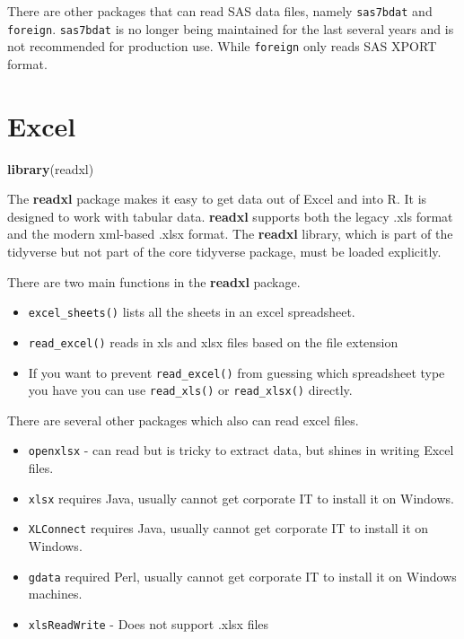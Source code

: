 \documentclass[]{book}
\newenvironment{Shaded}{\begin{snugshade}}{\end{snugshade}}
\newcommand{\KeywordTok}[1]{\textcolor[rgb]{0.13,0.29,0.53}{\textbf{#1}}}
\newcommand{\NormalTok}[1]{#1}
\providecommand{\tightlist}{%
  \setlength{\itemsep}{0pt}\setlength{\parskip}{0pt}}
\newenvironment{rmdblock}[1]
  {\begin{shaded*}
  \begin{itemize}
  \renewcommand{\labelitemi}{
    \raisebox{-.7\height}[0pt][0pt]{
      {\setkeys{Gin}{width=3em,keepaspectratio}\texttt{[image: images/\#1]}}
    }
  }
  \item
  }
  {
  \end{itemize}
  \end{shaded*}
  }
\newenvironment{rmdnote}
  {\begin{rmdblock}{note}}
  {\end{rmdblock}}
\let\BeginKnitrBlock\begin \let\EndKnitrBlock\end
\begin{document}
\BeginKnitrBlock{rmdwarning}
There are other packages that can read SAS data files, namely
\texttt{sas7bdat} and \texttt{foreign}. \texttt{sas7bdat} is no longer
being maintained for the last several years and is not recommended for
production use. While \texttt{foreign} only reads SAS XPORT format.
\EndKnitrBlock{rmdwarning}

\section{Excel}\label{excel}

\begin{Shaded}
\begin{Highlighting}[]
\KeywordTok{library}\NormalTok{(readxl)}
\end{Highlighting}
\end{Shaded}

The \textbf{readxl} package makes it easy to get data out of Excel and
into R. It is designed to work with tabular data. \textbf{readxl}
supports both the legacy .xls format and the modern xml-based .xlsx
format. The \textbf{readxl} library, which is part of the tidyverse but
not part of the core tidyverse package, must be loaded explicitly.

There are two main functions in the \textbf{readxl} package.

\begin{itemize}
\tightlist
\item
  \texttt{excel\_sheets()} lists all the sheets in an excel spreadsheet.
\item
  \texttt{read\_excel()} reads in xls and xlsx files based on the file
  extension
\end{itemize}

\begin{rmdnote}
If you want to prevent \texttt{read\_excel()} from guessing which
spreadsheet type you have you can use \texttt{read\_xls()} or
\texttt{read\_xlsx()} directly.
\end{rmdnote}

There are several other packages which also can read excel files.

\begin{itemize}
\tightlist
\item
  \texttt{openxlsx} - can read but is tricky to extract data, but shines
  in writing Excel files.
\item
  \texttt{xlsx} requires Java, usually cannot get corporate IT to
  install it on Windows.
\item
  \texttt{XLConnect} requires Java, usually cannot get corporate IT to
  install it on Windows.
\item
  \texttt{gdata} required Perl, usually cannot get corporate IT to
  install it on Windows machines.
\item
  \texttt{xlsReadWrite} - Does not support .xlsx files
\end{itemize}
\end{document}
